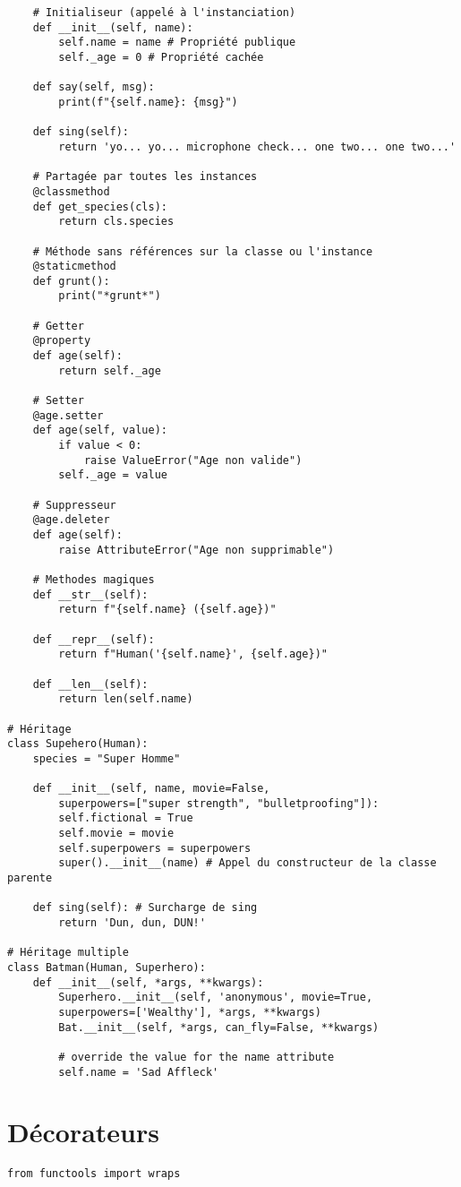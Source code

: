 \documentclass{article}
\begin{document}
\begin{multicols*}{4}
\begin{lstlisting}
    # Initialiseur (appelé à l'instanciation)
    def __init__(self, name):
        self.name = name # Propriété publique
        self._age = 0 # Propriété cachée
    
    def say(self, msg):
        print(f"{self.name}: {msg}")

    def sing(self):
        return 'yo... yo... microphone check... one two... one two...'
        
    # Partagée par toutes les instances
    @classmethod
    def get_species(cls):
        return cls.species

    # Méthode sans références sur la classe ou l'instance
    @staticmethod
    def grunt():
        print("*grunt*")

    # Getter
    @property
    def age(self):
        return self._age

    # Setter 
    @age.setter
    def age(self, value):
        if value < 0:
            raise ValueError("Age non valide")
        self._age = value

    # Suppresseur 
    @age.deleter
    def age(self):
        raise AttributeError("Age non supprimable")

    # Methodes magiques
    def __str__(self):
        return f"{self.name} ({self.age})"
    
    def __repr__(self):
        return f"Human('{self.name}', {self.age})"
    
    def __len__(self):
        return len(self.name)

# Héritage
class Supehero(Human):
    species = "Super Homme"

    def __init__(self, name, movie=False,
        superpowers=["super strength", "bulletproofing"]):
        self.fictional = True 
        self.movie = movie
        self.superpowers = superpowers
        super().__init__(name) # Appel du constructeur de la classe parente 

    def sing(self): # Surcharge de sing
        return 'Dun, dun, DUN!'

# Héritage multiple 
class Batman(Human, Superhero):
    def __init__(self, *args, **kwargs):
        Superhero.__init__(self, 'anonymous', movie=True,
        superpowers=['Wealthy'], *args, **kwargs)
        Bat.__init__(self, *args, can_fly=False, **kwargs)

        # override the value for the name attribute
        self.name = 'Sad Affleck'
\end{lstlisting}

\section*{Décorateurs}
\begin{lstlisting}
from functools import wraps


\end{lstlisting}
\end{multicols*}
\end{document}
